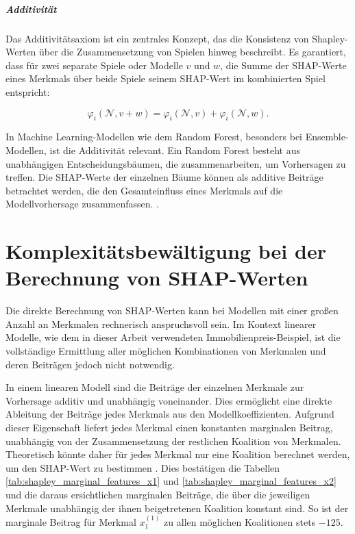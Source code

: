 \paragraph{Additivität}

Das Additivitätsaxiom ist ein zentrales Konzept, das die Konsistenz von Shapley-Werten 
über die Zusammensetzung von Spielen hinweg beschreibt. Es garantiert, 
dass für zwei separate Spiele oder Modelle \(v\) und \(w\), die Summe der SHAP-Werte eines 
Merkmals über beide Spiele seinem SHAP-Wert im kombinierten Spiel entspricht:

\begin{equation}
    \varphi_i(\mathcal{N}, v + w) = \varphi_i (\mathcal{N}, v) + \varphi_i (\mathcal{N}, w).
\end{equation}

In Machine Learning-Modellen wie dem Random Forest, besonders bei Ensemble-Modellen, 
ist die Additivität relevant. Ein Random Forest besteht aus unabhängigen Entscheidungsbäumen, 
die zusammenarbeiten, um Vorhersagen zu treffen. Die SHAP-Werte der einzelnen Bäume 
können als additive Beiträge betrachtet werden, die den Gesamteinfluss eines Merkmals 
auf die Modellvorhersage zusammenfassen. \cite[S. 32]{Molnar_2023}.

\chapter{Komplexitätsbewältigung bei der Berechnung von SHAP-Werten}
\label{sec:estimators}

Die direkte Berechnung von SHAP-Werten kann bei Modellen mit einer 
großen Anzahl an Merkmalen rechnerisch anspruchsvoll sein. Im Kontext linearer Modelle, 
wie dem in dieser Arbeit verwendeten Immobilienpreis-Beispiel, 
ist die vollständige Ermittlung aller möglichen Kombinationen von Merkmalen und deren 
Beiträgen jedoch nicht notwendig. 

In einem linearen Modell sind die Beiträge der einzelnen Merkmale zur Vorhersage additiv 
und unabhängig voneinander. Dies ermöglicht eine direkte Ableitung der Beiträge 
jedes Merkmals aus den Modellkoeffizienten. Aufgrund dieser Eigenschaft 
liefert jedes Merkmal einen konstanten marginalen Beitrag, 
unabhängig von der Zusammensetzung der restlichen Koalition von Merkmalen. 
Theoretisch könnte daher für jedes Merkmal nur eine Koalition berechnet werden, 
um den SHAP-Wert zu bestimmen \cite[S. 38]{Molnar_2023}. Dies bestätigen die
Tabellen \ref{tab:shapley_marginal_features_x1} und \ref{tab:shapley_marginal_features_x2}
und die daraus ersichtlichen marginalen Beiträge, die über die jeweiligen Merkmale
unabhängig der ihnen beigetretenen Koalition konstant sind. So ist der marginale Beitrag für Merkmal $x_1^{(1)}$
zu allen möglichen Koalitionen stets $-125$.

